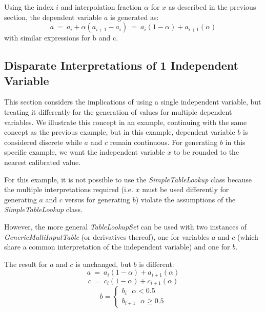 \documentclass[11pt,fleqn]{report}
\begin{document}
Using the index $i$ and interpolation fraction $\alpha$ for $x$ as described in
the previous section, the dependent variable $a$ is generated as:
\begin{equation}
  a ~=~ a_i + \alpha (a_{i+1} - a_i)~=~ a_i(1- \alpha) + a_{i+1} (\alpha)
\end{equation}
with similar expressions for b and c.

\subsection{Disparate Interpretations of 1 Independent Variable}
This section considers the implications of using a single independent variable,
but treating it differently for the generation of values for multiple dependent
variables. We illustrate this concept in an example, continuing
with the same concept as the previous example, but in
this example, dependent variable $b$ is considered discrete while $a$ and $c$
remain continuous.
For generating $b$ in this specific example, we want the independent variable
$x$ to be rounded to the nearest calibrated value.

For this example, it is not possible to use the \textit{SimpleTableLookup}
class because the multiple interpretations required (i.e. $x$ must be used
differently for generating $a$ and $c$ versus for generating $b$) violate the
assumptions of the \textit{SimpleTableLookup} class.

However, the more general \textit{TableLookupSet} can be used with two
instances of \textit{GenericMultiInputTable} (or derivatives thereof),
one for variables $a$ and $c$
(which share a common interpretation of the independent variable) and one for
$b$.

The result for $a$ and $c$ is unchanged, but $b$ is different:
\begin{equation*}
  a ~=~ a_i(1- \alpha) + a_{i+1} (\alpha)
\end{equation*}
\begin{equation*}
  c ~=~ c_i(1- \alpha) + c_{i+1} (\alpha)
\end{equation*}
\begin{equation*}  b = \begin{cases}
       b_i  ~~~  \alpha < 0.5 \\
       b_{i+1}  ~~~  \alpha \geqslant 0.5
      \end{cases}
\end{equation*}
\end{document}
